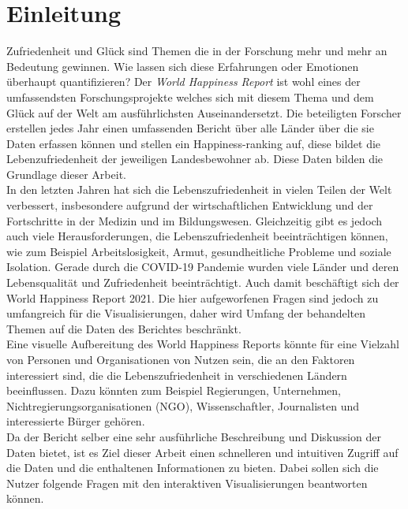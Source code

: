 \section{Einleitung}

Zufriedenheit und Glück sind Themen die in der Forschung mehr und mehr an Bedeutung gewinnen. \cite{veenhoven2012cross}
Wie lassen sich diese Erfahrungen oder Emotionen überhaupt quantifizieren? Der \textit{World Happiness Report} ist wohl eines der umfassendsten Forschungsprojekte welches sich mit diesem Thema und dem Glück auf der Welt am ausführlichsten Auseinandersetzt. Die beteiligten Forscher erstellen jedes Jahr einen umfassenden Bericht über alle Länder über die sie Daten erfassen können und stellen ein Happiness-ranking auf, diese bildet die Lebenzufriedenheit der jeweiligen Landesbewohner ab. Diese Daten bilden die Grundlage dieser Arbeit. \\

In den letzten Jahren hat sich die Lebenszufriedenheit in vielen Teilen der Welt verbessert, insbesondere aufgrund der wirtschaftlichen Entwicklung und der Fortschritte in der Medizin und im Bildungswesen. \cite{lozano2018measuring} Gleichzeitig gibt es jedoch auch viele Herausforderungen, die Lebenszufriedenheit beeinträchtigen können, wie zum Beispiel Arbeitslosigkeit, Armut, gesundheitliche Probleme und soziale Isolation. Gerade durch die COVID-19 Pandemie wurden viele Länder und deren Lebensqualität und Zufriedenheit beeinträchtigt.\cite{prime2020risk} \cite{krendl2021impact} Auch damit beschäftigt sich der World Happiness Report 2021. \cite{helliwell_world_2021} Die hier aufgeworfenen Fragen sind jedoch zu umfangreich für die Visualisierungen, daher wird Umfang der behandelten Themen auf die Daten des Berichtes beschränkt. \\

Eine visuelle Aufbereitung des World Happiness Reports könnte für eine Vielzahl von Personen und Organisationen von Nutzen sein, die an den Faktoren interessiert sind, die die Lebenszufriedenheit in verschiedenen Ländern beeinflussen. Dazu könnten zum Beispiel Regierungen, Unternehmen, Nichtregierungsorganisationen (NGO), Wissenschaftler, Journalisten und interessierte Bürger gehören. \\

Da der Bericht selber eine sehr ausführliche Beschreibung und Diskussion der Daten bietet, ist es Ziel dieser Arbeit einen schnelleren und intuitiven Zugriff auf die Daten und die enthaltenen Informationen zu bieten. Dabei sollen sich die Nutzer folgende Fragen mit den interaktiven Visualisierungen beantworten können. \\

